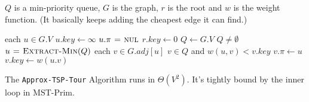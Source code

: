 $Q$ is a min-priority queue, $G$ is the graph, $r$ is the root and $w$ is the
weight function. (It basically keeps adding the cheapest edge it can find.)
\begin{codebox}
\li \For each $u \in G.V$ \Do
\li   $u.key \gets \infty$
\li   $u.\pi \mathrel{\hspace{1pt}=\hspace{1pt}} \textnormal{\scshape nul}$ \End
\li $r.key \gets 0$
\li $Q \gets G.V$
\li \While $Q \neq \emptyset$ \Do
\li   $u \mathrel{\hspace{1pt}=\hspace{1pt}} \textnormal{\scshape Extract-Min}(Q)$
\li   \For each $v \in G.adj[u]$ \Do
\li     \If $v \in Q$ and $w(u,v) < v.key$ \Do
\li       $v.\pi \gets u$
\li       $v.key \gets w(u.v)$
\end{codebox}

The \texttt{Approx-TSP-Tour} Algorithm runs in $\Theta(V^2)$. It's tightly bound
by the inner loop in MST-Prim.


